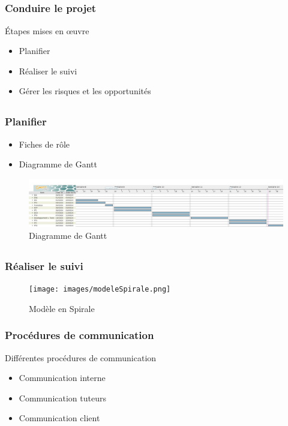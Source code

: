 \subsection{} %

\begin{frame}
\frametitle{Conduire le projet}
Étapes mises en \oe{}uvre
	\begin{itemize}
		\item Planifier
		\item Réaliser le suivi
		\item Gérer les risques et les opportunités
	\end{itemize}
\end{frame}

\subsection{}

\begin{frame}
\frametitle{Planifier}
\begin{itemize}
	\item Fiches de rôle
	\item Diagramme de Gantt
\end{itemize}
\begin{figure}
\begin{center}
	\includegraphics[scale=0.15]{images/exempleGantt.jpg}
	\caption{Diagramme de Gantt}
	\label{DG}
\end{center}
\end{figure}
\end{frame}

\subsection{}

\begin{frame}
\frametitle{Réaliser le suivi}
\begin{figure}
\begin{center}
\texttt{[image: images/modeleSpirale.png]}
\caption{Modèle en Spirale}
\label{MS}
\end{center}
\end{figure}
\end{frame}

\begin{frame}
\frametitle{Procédures de communication}
Différentes procédures de communication
\begin{itemize}
\item Communication interne
\item Communication tuteurs
\item Communication client
\end{itemize}
\end{frame}
